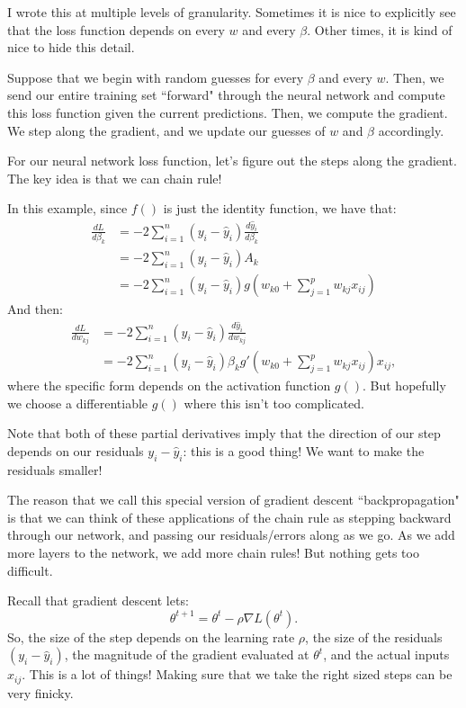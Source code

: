 I wrote this at multiple levels of granularity. Sometimes it is nice to explicitly see that the loss function depends on every $w$ and every $\beta$. Other times, it is kind of nice to hide this detail. 

Suppose that we begin with random guesses for every $\beta$ and every $w$. Then, we send our entire training set ``forward" through the neural network and compute this loss function given the current predictions. Then, we compute the gradient. We step along the gradient, and we update our guesses of $w$ and $\beta$ accordingly. 

For our neural network loss function, let's figure out the steps along the gradient. The key idea is that we can chain rule! 

In this example, since $f()$ is just the identity function, we have that:
\begin{align*}
\frac{dL}{d \beta_k} &= -2 \sum_{i=1}^n (y_i - \hat{y}_i) \frac{d\hat{y}_i}{d \beta_k} \\
&= - 2 \sum_{i=1}^n (y_i - \hat{y}_i) A_k \\
&= -2 \sum_{i=1}^n (y_i - \hat{y}_i) g \left(w_{k0} + \sum_{j=1}^p w_{kj} x_{ij}\right) 
\end{align*}
And then:
\begin{align*}
\frac{dL}{d w_{kj}} &= -2 \sum_{i=1}^n (y_i - \hat{y}_i) \frac{d\hat{y}_i}{d w_{kj}} \\
&= -2 \sum_{i=1}^n (y_i - \hat{y}_i ) \beta_{k} g' \left(w_{k0} + \sum_{j=1}^p w_{kj} x_{ij}\right) x_{ij},
\end{align*}
where the specific form depends on the activation function $g()$. But hopefully we choose a differentiable $g()$ where this isn't too complicated.

Note that both of these partial derivatives imply that the direction of our step depends on our residuals $y_i - \hat{y}_i$: this is a good thing! We want to make the residuals smaller! 

The reason that we call this special version of gradient descent ``backpropagation" is that we can think of these applications of the chain rule as stepping backward through our network, and passing our residuals/errors along as we go. As we add more layers to the network, we add more chain rules! But nothing gets too difficult. 

Recall that gradient descent lets:
$$
\theta^{t+1} = \theta^t - \rho \nabla L (\theta^{t}).
$$
So, the size of the step depends on the learning rate $\rho$, the size of the residuals $(y_i - \hat{y}_i)$, the magnitude of the gradient evaluated at $\theta^{t}$, and the actual inputs $x_{ij}$. This is a lot of things! Making sure that we take the right sized steps can be very finicky. 

